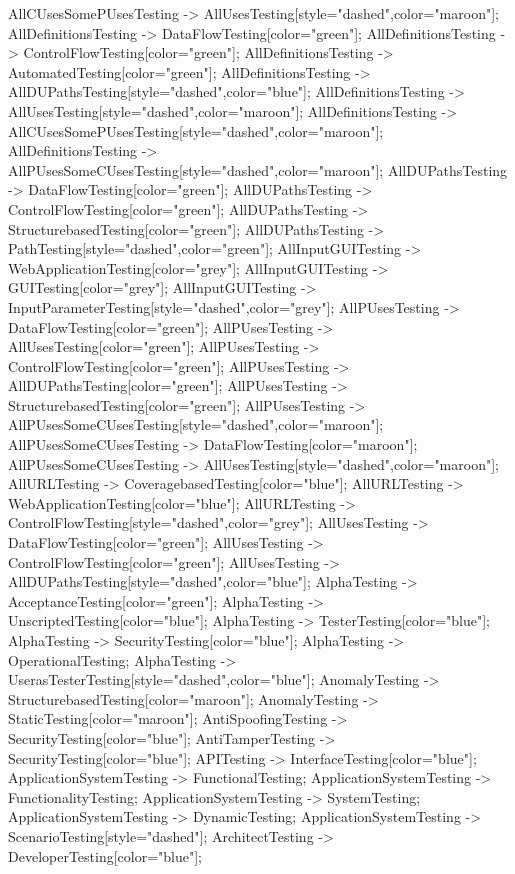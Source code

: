 \documentclass{article}
\begin{document}
{AllCUsesSomePUsesTesting -> AllUsesTesting[style="dashed",color="maroon"];
AllDefinitionsTesting -> DataFlowTesting[color="green"];
AllDefinitionsTesting -> ControlFlowTesting[color="green"];
AllDefinitionsTesting -> AutomatedTesting[color="green"];
AllDefinitionsTesting -> AllDUPathsTesting[style="dashed",color="blue"];
AllDefinitionsTesting -> AllUsesTesting[style="dashed",color="maroon"];
AllDefinitionsTesting -> AllCUsesSomePUsesTesting[style="dashed",color="maroon"];
AllDefinitionsTesting -> AllPUsesSomeCUsesTesting[style="dashed",color="maroon"];
AllDUPathsTesting -> DataFlowTesting[color="green"];
AllDUPathsTesting -> ControlFlowTesting[color="green"];
AllDUPathsTesting -> StructurebasedTesting[color="green"];
AllDUPathsTesting -> PathTesting[style="dashed",color="green"];
AllInputGUITesting -> WebApplicationTesting[color="grey"];
AllInputGUITesting -> GUITesting[color="grey"];
AllInputGUITesting -> InputParameterTesting[style="dashed",color="grey"];
AllPUsesTesting -> DataFlowTesting[color="green"];
AllPUsesTesting -> AllUsesTesting[color="green"];
AllPUsesTesting -> ControlFlowTesting[color="green"];
AllPUsesTesting -> AllDUPathsTesting[color="green"];
AllPUsesTesting -> StructurebasedTesting[color="green"];
AllPUsesTesting -> AllPUsesSomeCUsesTesting[style="dashed",color="maroon"];
AllPUsesSomeCUsesTesting -> DataFlowTesting[color="maroon"];
AllPUsesSomeCUsesTesting -> AllUsesTesting[style="dashed",color="maroon"];
AllURLTesting -> CoveragebasedTesting[color="blue"];
AllURLTesting -> WebApplicationTesting[color="blue"];
AllURLTesting -> ControlFlowTesting[style="dashed",color="grey"];
AllUsesTesting -> DataFlowTesting[color="green"];
AllUsesTesting -> ControlFlowTesting[color="green"];
AllUsesTesting -> AllDUPathsTesting[style="dashed",color="blue"];
AlphaTesting -> AcceptanceTesting[color="green"];
AlphaTesting -> UnscriptedTesting[color="blue"];
AlphaTesting -> TesterTesting[color="blue"];
AlphaTesting -> SecurityTesting[color="blue"];
AlphaTesting -> OperationalTesting;
AlphaTesting -> UserasTesterTesting[style="dashed",color="blue"];
AnomalyTesting -> StructurebasedTesting[color="maroon"];
AnomalyTesting -> StaticTesting[color="maroon"];
AntiSpoofingTesting -> SecurityTesting[color="blue"];
AntiTamperTesting -> SecurityTesting[color="blue"];
APITesting -> InterfaceTesting[color="blue"];
ApplicationSystemTesting -> FunctionalTesting;
ApplicationSystemTesting -> FunctionalityTesting;
ApplicationSystemTesting -> SystemTesting;
ApplicationSystemTesting -> DynamicTesting;
ApplicationSystemTesting -> ScenarioTesting[style="dashed"];
ArchitectTesting -> DeveloperTesting[color="blue"];
}
\end{document}
